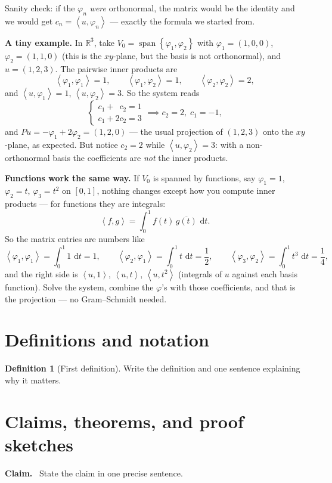 \documentclass[11pt]{article}
\newcommand{\R}{\mathbb{R}}
\newcommand{\1}{\mathbf{1}}
\newcommand{\dd}{\,\mathrm{d}}
\newcommand{\ip}[2]{\left\langle#1,#2\right\rangle}
\newcommand{\set}[1]{\left\{#1\right\}}
\DeclareMathOperator{\Span}{span}
\theoremstyle{notestyle}
\theoremstyle{definition}
\newtheorem{definition}[theorem]{Definition}
\newenvironment{claim}{\par\noindent\textbf{Claim.}\ }{\par}
\begin{document}
\par Sanity check: if the $\varphi_n$ \emph{were} orthonormal, the matrix would be the
identity and we would get $c_n = \ip{u}{\varphi_n}$ --- exactly the formula we started
from.

\par \textbf{A tiny example.} In $\R^3$, take $V_0 = \Span\set{\varphi_1, \varphi_2}$ with
$\varphi_1 = (1,0,0)$, $\varphi_2 = (1,1,0)$ (this is the $xy$-plane, but the basis is
not orthonormal), and $u = (1,2,3)$. The pairwise inner products are
$$\ip{\varphi_1}{\varphi_1} = 1, \qquad
\ip{\varphi_1}{\varphi_2} = 1, \qquad \ip{\varphi_2}{\varphi_2} = 2,$$
and $\ip{u}{\varphi_1} = 1$, $\ip{u}{\varphi_2} = 3$. So the system reads
$$\begin{cases} c_1 + \phantom{2}c_2 = 1 \\ c_1 + 2c_2 = 3 \end{cases}
\implies c_2 = 2, \; c_1 = -1,$$
and $Pu = -\varphi_1 + 2\varphi_2 = (1,2,0)$ --- the usual projection of $(1,2,3)$ onto
the $xy$-plane, as expected. But notice $c_2 = 2$ while $\ip{u}{\varphi_2} = 3$: with a
non-orthonormal basis the coefficients are \emph{not} the inner products.

\par \textbf{Functions work the same way.} If $V_0$ is spanned by functions, say
$\varphi_1 = 1$, $\varphi_2 = t$, $\varphi_3 = t^2$ on $[0,1]$, nothing changes except
how you compute inner products --- for functions they are integrals:
$$\ip{f}{g} = \int_0^1 f(t)\, \overline{g(t)}\, \dd t.$$
So the matrix entries are numbers like
$$\ip{\varphi_1}{\varphi_1} = \int_0^1 1\, \dd t = 1, \qquad
\ip{\varphi_2}{\varphi_1} = \int_0^1 t\, \dd t = \frac{1}{2}, \qquad
\ip{\varphi_3}{\varphi_2} = \int_0^1 t^3\, \dd t = \frac{1}{4},$$
and the right side is $\ip{u}{1}$, $\ip{u}{t}$, $\ip{u}{t^2}$ (integrals of $u$ against
each basis function). Solve the system, combine the $\varphi$'s with those
coefficients, and that is the projection --- no Gram--Schmidt needed.
\section{Definitions and notation}
\begin{definition}[First definition]
Write the definition and one sentence explaining why it matters.
\end{definition}

\section{Claims, theorems, and proof sketches}
\begin{claim}
State the claim in one precise sentence.
\end{claim}
\end{document}
